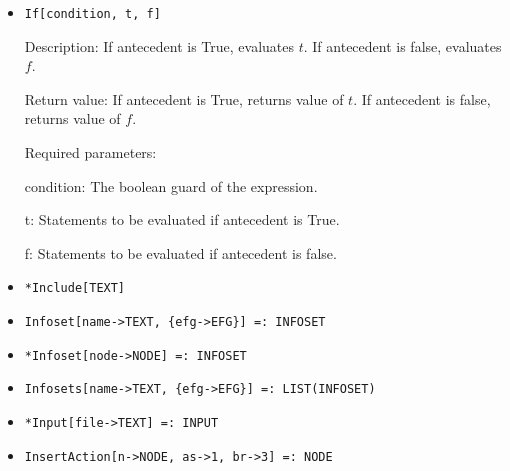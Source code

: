 \begin{itemize}


\item 
\protect \large \begin{verbatim}
If[condition, t, f]
\end{verbatim} \normalsize
  
\bd
\item
[Description:] If antecedent is True, evaluates $t$.  If
antecedent is false, evaluates $f$. 
\item
[Return value:] If antecedent is True, returns value of $t$.  If
antecedent is false, returns value of $f$.  
\item
[Required parameters:]\hfil\null
\bd
\item
[condition:] The boolean guard of the expression.
\item
[t:] Statements to be evaluated if antecedent is True. 
\item
[f:] Statements to be evaluated if antecedent is false. 
\ed
\ed


\item
\protect \large \begin{verbatim}
*Include[TEXT]
\end{verbatim}\normalsize

\item
\protect \large \begin{verbatim} 
Infoset[name->TEXT, {efg->EFG}] =: INFOSET
\end{verbatim}\normalsize

\item
\protect \large \begin{verbatim}
*Infoset[node->NODE] =: INFOSET
\end{verbatim}\normalsize

\item
\protect \large \begin{verbatim} 
Infosets[name->TEXT, {efg->EFG}] =: LIST(INFOSET)
\end{verbatim}\normalsize

\item
\protect \large \begin{verbatim}
*Input[file->TEXT] =: INPUT
\end{verbatim}\normalsize

\item
\protect \large \begin{verbatim}
InsertAction[n->NODE, as->1, br->3] =: NODE
\end{verbatim}\normalsize


\end{itemize}
